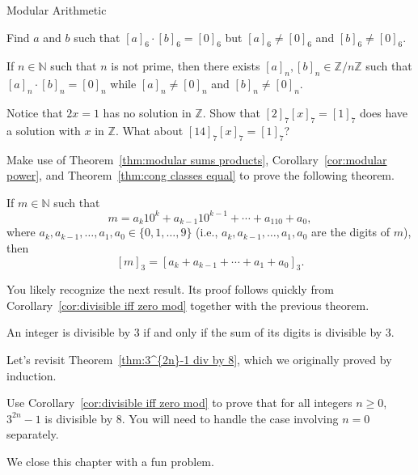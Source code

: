 \begin{section}{Modular Arithmetic}
\begin{problem}
Find $a$ and $b$ such that $[a]_6\cdot[b]_6 = [0]_6$ but $[a]_6 \neq [0]_6$ and $[b]_6 \neq [0]_6$. %
\end{problem}

\begin{theorem}
If $n\in \mathbb{N}$ such that $n$ is not prime, then there exists $[a]_n, [b]_n \in \mathbb{Z}/n\mathbb{Z}$ such that $[a]_n\cdot[b]_n = [0]_n$ while $[a]_n \neq [0]_n$ and $[b]_n \neq [0]_n$.
\end{theorem}

\begin{problem}
Notice that $2x = 1$ has no solution in $\mathbb{Z}$. Show that $[2]_7[x]_7 = [1]_7$ does have a solution with $x$ in $\mathbb{Z}$. What about $[14]_7[x]_7 = [1]_7$?
\end{problem}

Make use of Theorem~\ref{thm:modular sums products}, Corollary~\ref{cor:modular power}, and Theorem~\ref{thm:cong classes equal} to prove the following theorem.

\begin{theorem}
If $m\in \mathbb{N}$ such that
\[
m=a_k10^k + a_{k-1}10^{k-1} + \cdots + a_110 + a_0,
\]
where $a_k, a_{k-1}, \ldots, a_1, a_0\in \{0,1,\ldots, 9\}$ (i.e., $a_k, a_{k-1}, \ldots, a_1, a_0$ are the digits of $m$), then
\[
[m]_3 =  [a_k + a_{k-1} + \cdots + a_1 + a_0]_3.
\]
\end{theorem}

You likely recognize the next result. Its proof follows quickly from Corollary~\ref{cor:divisible iff zero mod} together with the previous theorem.

\begin{theorem}
An integer is divisible by $3$ if and only if the sum of its digits is divisible by $3$.
\end{theorem}

Let's revisit Theorem~\ref{thm:3^{2n}-1 div by 8}, which we originally proved by induction.

\begin{problem}
Use Corollary~\ref{cor:divisible iff zero mod} to prove that for all integers $n \ge 0$, $3^{2n}-1$ is divisible by $8$. You will need to handle the case involving $n=0$ separately.
\end{problem}

We close this chapter with a fun problem.


\end{section}
